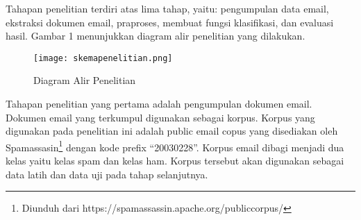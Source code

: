 Tahapan penelitian terdiri atas lima tahap, yaitu: pengumpulan data email, ekstraksi dokumen email, praproses, membuat fungsi klasifikasi, dan evaluasi hasil. Gambar 1 menunjukkan diagram alir penelitian yang dilakukan.
\begin{figure*}[h!]
	\centering
	\texttt{[image: skemapenelitian.png]}
	\caption{Diagram Alir Penelitian}
	\label{fig:skemapenelitian}
\end{figure*}

Tahapan penelitian yang pertama adalah pengumpulan dokumen email. Dokumen email yang terkumpul digunakan sebagai korpus. Korpus yang digunakan pada penelitian ini adalah public email copus yang disediakan oleh Spamassasin\footnote{Diunduh dari  https://spamassassin.apache.org/publiccorpus/} dengan kode prefix “20030228”. Korpus email dibagi menjadi dua kelas yaitu kelas spam dan kelas ham. Korpus tersebut akan digunakan sebagai data latih dan data uji pada tahap selanjutnya.

